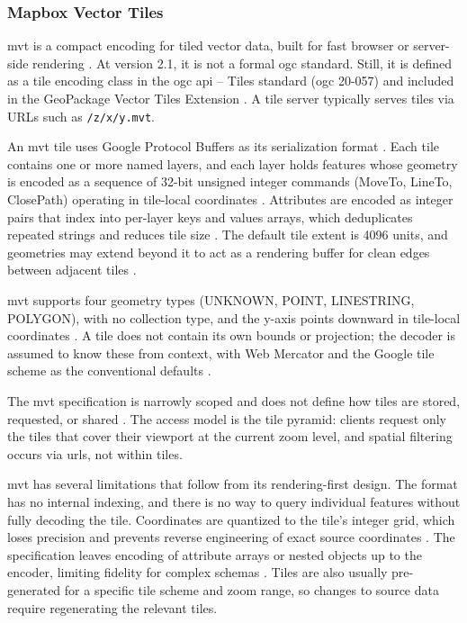 \subsubsection{Mapbox Vector Tiles}
\acrfull{mvt} is a compact encoding for tiled vector data, built for fast browser or server-side rendering \parencite{mapbox2017_vector_tile_specification_21}. At version 2.1, it is not a formal \acrshort{ogc} standard. Still, it is defined as a tile encoding class in the \acrshort{ogc} \acrshort{api} -- Tiles standard (\acrshort{ogc} 20-057) \parencite{ogc2022_20057_api_tiles} and included in the GeoPackage Vector Tiles Extension \parencite{ogc2018_vector_tiles_pilot_geopackage_extension}. A tile server typically serves tiles via URLs such as \texttt{/z/x/y.mvt}.

An \acrshort{mvt} tile uses Google Protocol Buffers as its serialization format \parencite{mapbox2017_vector_tile_specification_21}. Each tile contains one or more named layers, and each layer holds features whose geometry is encoded as a sequence of 32-bit unsigned integer commands (MoveTo, LineTo, ClosePath) operating in tile-local coordinates \parencite{mapbox2017_vector_tile_specification_21}. Attributes are encoded as integer pairs that index into per-layer keys and values arrays, which deduplicates repeated strings and reduces tile size \parencite{mapbox2017_vector_tile_specification_21}. The default tile extent is 4096 units, and geometries may extend beyond it to act as a rendering buffer for clean edges between adjacent tiles \parencite{mapbox2017_vector_tile_specification_21}.

\acrshort{mvt} supports four geometry types (UNKNOWN, POINT, LINESTRING, POLYGON), with no collection type, and the y-axis points downward in tile-local coordinates \parencite{mapbox2017_vector_tile_specification_21}. A tile does not contain its own bounds or projection; the decoder is assumed to know these from context, with Web Mercator and the Google tile scheme as the conventional defaults \parencite{mapbox2017_vector_tile_specification_21}.

The \acrshort{mvt} specification is narrowly scoped and does not define how tiles are stored, requested, or shared \parencite{mapbox2017_vector_tile_specification_21}. The access model is the tile pyramid: clients request only the tiles that cover their viewport at the current zoom level, and spatial filtering occurs via \acrshort{url}s, not within tiles.

\acrshort{mvt} has several limitations that follow from its rendering-first design. The format has no internal indexing, and there is no way to query individual features without fully decoding the tile. Coordinates are quantized to the tile's integer grid, which loses precision and prevents reverse engineering of exact source coordinates \parencite{mapbox2017_vector_tile_specification_21}. The specification leaves encoding of attribute arrays or nested objects up to the encoder, limiting fidelity for complex schemas \parencite{mapbox2017_vector_tile_specification_21}. Tiles are also usually pre-generated for a specific tile scheme and zoom range, so changes to source data require regenerating the relevant tiles.

